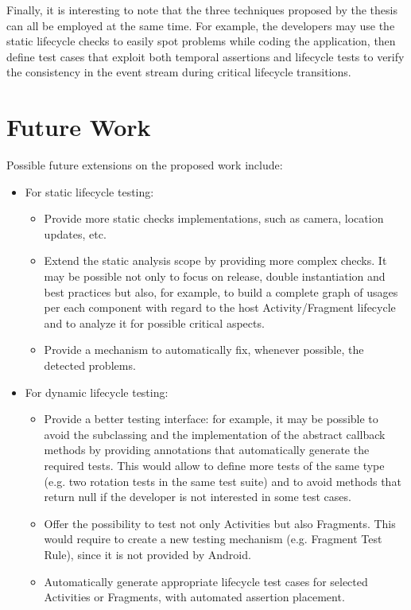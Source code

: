 \documentclass[11pt,a4paper,notitlepage]{article}
\begin{document}
Finally, it is interesting to note that the three techniques proposed by the thesis can all be employed at the same time. For example, the developers may use the static lifecycle checks to easily spot problems while coding the application, then define test cases that exploit both temporal assertions and lifecycle tests to verify the consistency in the event stream during critical lifecycle transitions.

\section{Future Work}
Possible future extensions on the proposed work include:
\begin{itemize}
	\item For static lifecycle testing:
	\begin{itemize}
		\item Provide more static checks implementations, such as camera, location updates, etc.
		\item Extend the static analysis scope by providing more complex checks. It may be possible not only to focus on release, double instantiation and best practices but also, for example, to build a complete graph of usages per each component with regard to the host Activity/Fragment lifecycle and to analyze it for possible critical aspects.
		\item Provide a mechanism to automatically fix, whenever possible, the detected problems.
	\end{itemize}
	\item For dynamic lifecycle testing:
	\begin{itemize}
		\item Provide a better testing interface: for example, it may be possible to avoid the subclassing and the implementation of the abstract callback methods by providing annotations that automatically generate the required tests. This would allow to define more tests of the same type (e.g. two rotation tests in the same test suite) and to avoid methods that return null if the developer is not interested in some test cases.
		\item Offer the possibility to test not only Activities but also Fragments. This would require to create a new testing mechanism (e.g. Fragment Test Rule), since it is not provided by Android.
		\item Automatically generate appropriate lifecycle test cases for selected Activities or Fragments, with automated assertion placement.
	\end{itemize}

\end{itemize}
\end{document}
